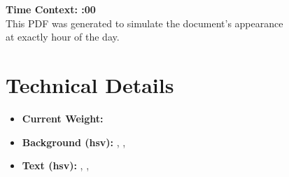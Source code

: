 \documentclass[12pt]{article}
\begin{document}
\begin{center}
    \vspace*{2in}
    {\Huge \textbf{Time Context: \currenthour:00}} \\
    \vspace{1in}
    \large
    This PDF was generated to simulate the document's appearance \\
    at exactly hour \textbf{\currenthour} of the day.
\end{center}

\newpage
\section*{Technical Details}
\begin{itemize}
    \item \textbf{Current Weight:}
    \item \textbf{Background (hsv):}
    ,
    ,
    \item \textbf{Text (hsv):}
    ,
    ,
\end{itemize}
\end{document}
